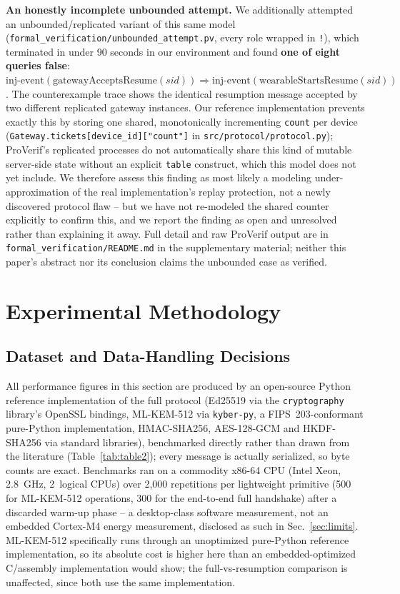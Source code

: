 \documentclass[conference]{IEEEtran}
\begin{document}
\textbf{An honestly incomplete unbounded attempt.} We additionally attempted
an unbounded/replicated variant of this same model
(\texttt{formal\_verification/unbounded\_attempt.pv}, every role wrapped in
\texttt{!}), which terminated in under 90 seconds in our environment and
found \textbf{one of eight queries false}:
$\mathrm{inj\text{-}event}(\mathrm{gatewayAcceptsResume}(\mathit{sid})) \Rightarrow
\mathrm{inj\text{-}event}(\mathrm{wearableStartsResume}(\mathit{sid}))$. The
counterexample trace shows the identical resumption message accepted by two
different replicated gateway instances. Our reference implementation
prevents exactly this by storing one shared, monotonically incrementing
\texttt{count} per device (\texttt{Gateway.tickets[device\_id]["count"]}
in \texttt{src/protocol/protocol.py}); ProVerif's replicated processes do
not automatically share this kind of mutable server-side state without an
explicit \texttt{table} construct, which this model does not yet include.
We therefore assess this finding as most likely a modeling
under-approximation of the real implementation's replay protection, not a
newly discovered protocol flaw -- but we have not re-modeled the shared
counter explicitly to confirm this, and we report the finding as open and
unresolved rather than explaining it away. Full detail and raw ProVerif
output are in \texttt{formal\_verification/README.md} in the supplementary
material; neither this paper's abstract nor its conclusion claims the
unbounded case as verified.

\section{Experimental Methodology}
\label{sec:eval}

\subsection{Dataset and Data-Handling Decisions}
\label{sec:eval-a}

All performance figures in this section are produced by an open-source
Python reference implementation of the full protocol (Ed25519 via the
\texttt{cryptography} library's OpenSSL bindings, ML-KEM-512 via
\texttt{kyber-py}, a FIPS~203-conformant pure-Python implementation,
HMAC-SHA256, AES-128-GCM and HKDF-SHA256 via standard libraries),
benchmarked directly rather than drawn from the literature
(Table~\ref{tab:table2}); every message is actually serialized, so byte
counts are exact. Benchmarks ran on a commodity x86-64 CPU
(Intel Xeon, 2.8~GHz, 2~logical CPUs) over 2{,}000 repetitions per
lightweight primitive (500 for ML-KEM-512 operations, 300 for the
end-to-end full handshake) after a discarded warm-up phase -- a
desktop-class software measurement, not an embedded Cortex-M4 energy
measurement, disclosed as such in Sec.~\ref{sec:limits}. ML-KEM-512
specifically runs through an unoptimized pure-Python reference
implementation, so its absolute cost is higher here than an
embedded-optimized C/assembly implementation would show; the
full-vs-resumption comparison is unaffected, since both use the same
implementation.
\end{document}
